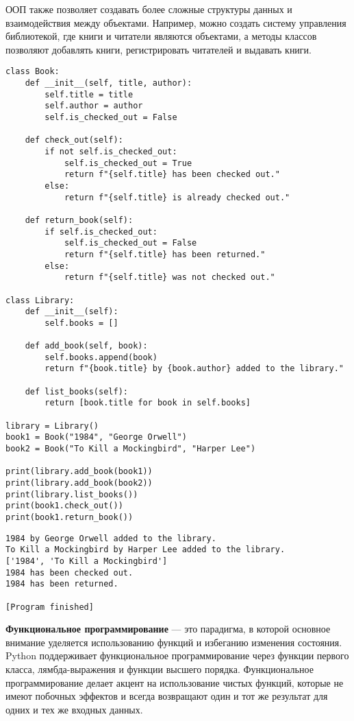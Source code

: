 ООП также позволяет создавать более сложные структуры данных и взаимодействия между объектами. Например, можно создать систему управления библиотекой, где книги и читатели являются объектами, а методы классов позволяют добавлять книги, регистрировать читателей и выдавать книги.

\begin{verbatim}
class Book:
    def __init__(self, title, author):
        self.title = title
        self.author = author
        self.is_checked_out = False

    def check_out(self):
        if not self.is_checked_out:
            self.is_checked_out = True
            return f"{self.title} has been checked out."
        else:
            return f"{self.title} is already checked out."

    def return_book(self):
        if self.is_checked_out:
            self.is_checked_out = False
            return f"{self.title} has been returned."
        else:
            return f"{self.title} was not checked out."

class Library:
    def __init__(self):
        self.books = []

    def add_book(self, book):
        self.books.append(book)
        return f"{book.title} by {book.author} added to the library."

    def list_books(self):
        return [book.title for book in self.books]

library = Library()
book1 = Book("1984", "George Orwell")
book2 = Book("To Kill a Mockingbird", "Harper Lee")

print(library.add_book(book1))
print(library.add_book(book2))
print(library.list_books())
print(book1.check_out())
print(book1.return_book())
\end{verbatim}

\begin{verbatim}
1984 by George Orwell added to the library.
To Kill a Mockingbird by Harper Lee added to the library.
['1984', 'To Kill a Mockingbird']
1984 has been checked out.
1984 has been returned.

[Program finished]
\end{verbatim}

\textbf{Функциональное программирование} — это парадигма, в которой основное внимание уделяется использованию функций и избеганию изменения состояния. Python поддерживает функциональное программирование через функции первого класса, лямбда-выражения и функции высшего порядка. Функциональное программирование делает акцент на использование чистых функций, которые не имеют побочных эффектов и всегда возвращают один и тот же результат для одних и тех же входных данных.

